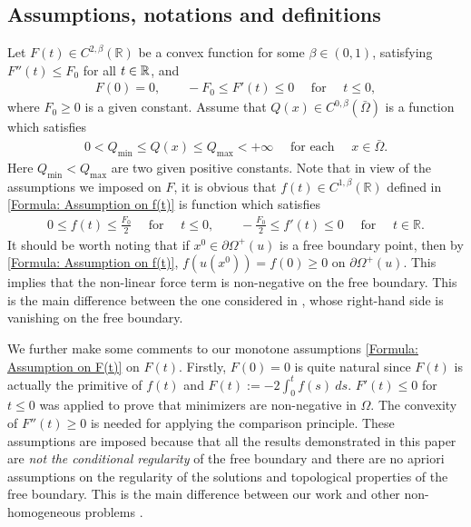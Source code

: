 \documentclass[11pt,reqno]{amsart}
\begin{document}
\subsection{Assumptions, notations and definitions}
Let $F(t)\in C^{2,\beta}(\mathbb{R})$ be a convex function for some $\beta\in(0,1)$, satisfying $F''(t)\leqslant F_{0}$ for all $t\in{\mathbb R}$, and
\begin{align}\label{Formula: Assumption on F(t)}
	F(0)=0,\qquad -F_{0}\leqslant F'(t)\leqslant0\quad\text{ for }\quad t\leqslant0,
\end{align}
where $F_{0}\geqslant0$ is a given constant. Assume that $Q(x)\in C^{0,\beta}(\bar{\Omega})$ is a function which satisfies
\begin{align}\label{Formula: Assumption on Q(x)}
	0<Q_{\mathrm{min}}\leqslant Q(x)\leqslant Q_{\mathrm{max}}<+\infty\quad\text{ for each }\quad x\in\bar{\Omega}.
\end{align}
Here $Q_{\mathrm{min}}<Q_{\mathrm{max}}$ are two given positive constants. Note that in view of the assumptions we imposed on $F$, it is obvious that $f(t)\in C^{1,\beta}(\mathbb{R})$ defined in \eqref{Formula: Assumption on f(t)} is function which satisfies
\begin{align}\label{Formula: Assumption on f(t)}
	0\leqslant f(t)\leqslant\frac{F_{0}}{2}\quad\text{ for }\quad t\leqslant0,\qquad-\frac{F_{0}}{2}\leqslant f'(t)\leqslant0\quad\text{ for }\quad t\in\mathbb{R}.
\end{align}
It should be worth noting that if $x^{0}\in\partial\varOmega^{+}(u)$ is a free boundary point, then by \eqref{Formula: Assumption on f(t)}, $f(u(x^{0}))=f(0)\geqslant0$ on $\partial\varOmega^{+}(u)$. This implies that the non-linear force term is non-negative on the free boundary. This is the main difference between the one considered in \cite{LT2015}, whose right-hand side is vanishing on the free boundary.

We further make some comments to our monotone assumptions \eqref{Formula: Assumption on F(t)} on $F(t)$. Firstly, $F(0)=0$ is quite natural since $F(t)$ is actually the primitive of $f(t)$ and $F(t):=-2\int_{0}^{t}f(s)\:ds$. $F'(t)\leqslant0$ for $t\leqslant0$ was applied to prove that minimizers are non-negative in $\Omega$. The convexity of $F''(t)\geqslant0$ is needed for applying the comparison principle. These assumptions are imposed because that all the results demonstrated in this paper are \emph{not the conditional regularity} of the free boundary and there are no apriori assumptions on the regularity of the solutions and topological properties of the free boundary. This is the main difference between our work and other non-homogeneous problems \cite{S2011,WZ2012}.
\end{document}
